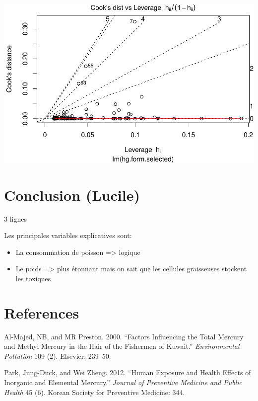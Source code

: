 \documentclass[12pt,]{article}
\providecommand{\tightlist}{%
  \setlength{\itemsep}{0pt}\setlength{\parskip}{0pt}}
\begin{document}
\includegraphics{Report_files/figure-latex/unnamed-chunk-16-7.pdf}

\section{Conclusion (Lucile)}\label{conclusion-lucile}

3 lignes

Les principales variables explicatives sont:

\begin{itemize}
\tightlist
\item
  La consommation de poisson =\textgreater{} logique
\item
  Le poids =\textgreater{} plus étonnant mais on sait que les cellules
  graisseuses stockent les toxiques
\end{itemize}

\section*{References}\label{references}

\hypertarget{refs}{}
\hypertarget{ref-al2000factors}{}
Al-Majed, NB, and MR Preston. 2000. ``Factors Influencing the Total
Mercury and Methyl Mercury in the Hair of the Fishermen of Kuwait.''
\emph{Environmental Pollution} 109 (2). Elsevier: 239--50.

\hypertarget{ref-park2012human}{}
Park, Jung-Duck, and Wei Zheng. 2012. ``Human Exposure and Health
Effects of Inorganic and Elemental Mercury.'' \emph{Journal of
Preventive Medicine and Public Health} 45 (6). Korean Society for
Preventive Medicine: 344.
\end{document}

